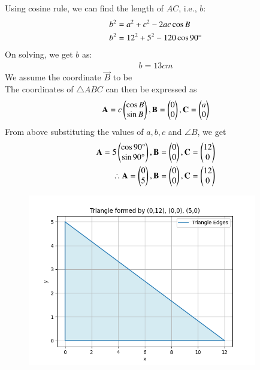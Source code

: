 \documentclass[journal]{IEEEtran}
\begin{document}
\begin{table}[h!]
      \centering
      
      \caption{}
\end{table}
Using cosine rule, we can find the length of $AC$, i.e., ${b}$:
\begin{align}
    b^2 &= a^2 + c^2 - 2ac\cos{B}\\
    b^2 &= 12^2 + 5^2 - 120\cos{90\degree}
\end{align}
On solving, we get ${b}$ as:
\begin{align}
    {b} = 13cm
\end{align}
We assume the coordinate $\vec{B}$ to be  \\
The coordinates of $\triangle ABC$ can then be expressed as
\begin{align}
    \mathbf{A} = c\begin{pmatrix}\cos{B} \\ \sin{B}\end{pmatrix}, \mathbf{B} = \begin{pmatrix}0 \\ 0\end{pmatrix}, \mathbf{C} = \begin{pmatrix}a \\ 0\end{pmatrix}
    \end{align}
    From above substituting the values of $a, b, c$ and $\angle{B}$, we get 
  \begin{align}
     \mathbf{A} = 5\begin{pmatrix}\cos{90\degree} \\ \sin{90\degree}\end{pmatrix}, \mathbf{B} = \begin{pmatrix}0 \\ 0\end{pmatrix}, \mathbf{C} = \begin{pmatrix} 12\\ 0\end{pmatrix} \\
    \therefore \mathbf{A} = \begin{pmatrix}0 \\ 5\end{pmatrix}, \mathbf{B} = \begin{pmatrix}0 \\ 0\end{pmatrix}, \mathbf{C} = \begin{pmatrix} 12\\ 0\end{pmatrix}   
\end{align}
\begin{figure}
    \centering
    \includegraphics[width=10cm]{figs/fig.png}
    \caption{}
    \label{fig:enter-label}
\end{figure}
\end{document}
